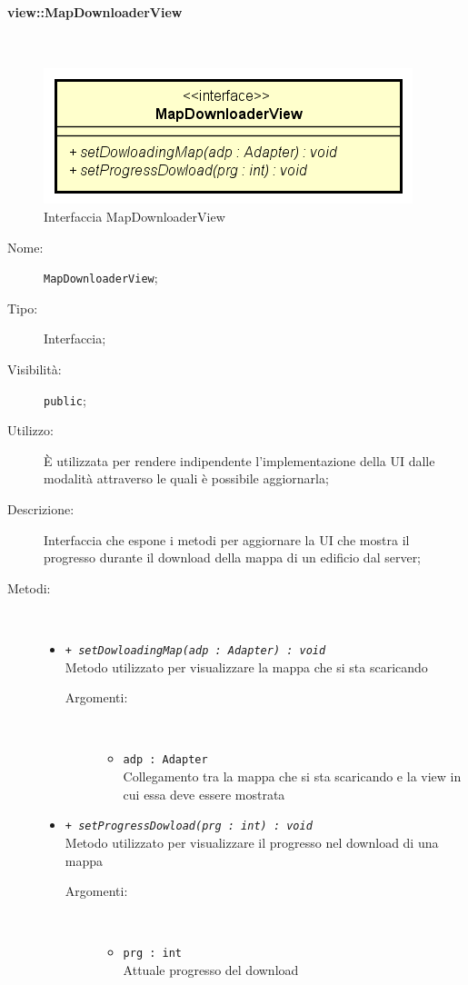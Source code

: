 \documentclass[../DefinizioneDiProdotto.tex]{subfiles}
\begin{document}
\paragraph{view::MapDownloaderView}
\
\begin{figure}[H]
	\centering
	\includegraphics[width=\maxwidth]{img/MapDownloaderView.png}
	\caption{Interfaccia MapDownloaderView}\label{fig:view::MapDownloaderView} 
\end{figure}
\begin{description}
	\item[Nome:] \texttt{MapDownloaderView};
	\item[Tipo:] Interfaccia;
	\item[Visibilità:] \texttt{public};
	\item[Utilizzo:] È utilizzata per rendere indipendente l'implementazione della UI dalle modalità attraverso le quali è possibile aggiornarla;
	\item[Descrizione:] Interfaccia che espone i metodi per aggiornare la UI che mostra il progresso durante il download della mappa di un edificio dal server;
	\item[Metodi:] \
	\begin{itemize}
		\item \texttt{+ \textit{setDowloadingMap(adp : Adapter) : void}}\\
		Metodo utilizzato per visualizzare la mappa che si sta scaricando
		\begin{description}
			\item[Argomenti:] \
			\begin{itemize}
				\item \texttt{adp : Adapter}\\
				Collegamento tra la mappa che si sta scaricando e la view in cui essa deve essere mostrata\end{itemize}
		\end{description}
		\item \texttt{+ \textit{setProgressDowload(prg : int) : void}}\\
		Metodo utilizzato per visualizzare il progresso nel download di una mappa
		\begin{description}
			\item[Argomenti:] \
			\begin{itemize}
				\item \texttt{prg : int}\\
				Attuale progresso del download\end{itemize}
		\end{description}
	\end{itemize}
\end{description}
\end{document}
